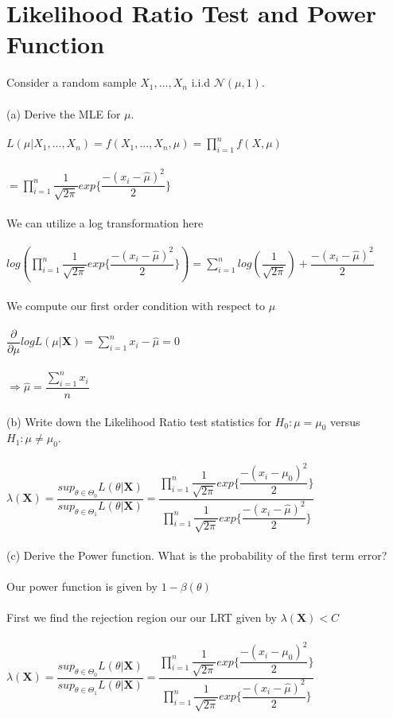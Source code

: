 \documentclass{article}
\begin{document}
\section{Likelihood Ratio Test and Power Function}
Consider a random sample $X_1,...,X_n$ i.i.d $\mathcal{N}(\mu,1)$.\\\\
(a) Derive the MLE for $\mu$.\\\\
$L(\mu|X_1,...,X_n)=f(X_1,...,X_n,\mu)=\prod_{i=1}^nf(X,\mu)$\\\\
$=\prod_{i=1}^n\dfrac{1}{\sqrt{2\pi}}exp\{\dfrac{-(x_i-\hat{\mu})^2}{2}\}$\\\\
We can utilize a log transformation here\\\\
$log(\prod_{i=1}^n\dfrac{1}{\sqrt{2\pi}}exp\{\dfrac{-(x_i-\hat{\mu})^2}{2}\})=\sum_{i=1}^nlog(\dfrac{1}{\sqrt{2\pi}})+\dfrac{-(x_i-\hat{\mu})^2}{2}$\\\\
We compute our first order condition with respect to $\mu$\\\\
$\dfrac{\partial}{\partial\mu}logL(\mu|\textbf{X})=\sum_{i=1}^nx_i-\hat{\mu}=0$\\\\
$\Rightarrow\hat{\mu}=\dfrac{\sum_{i=1}^nx_i}{n}$\\\\
(b) Write down the Likelihood Ratio test statistics for $H_0:\mu=\mu_0$ versus $H_1: \mu\neq\mu_0$.\\\\
$\lambda(\textbf{X})=\dfrac{sup_{\theta\in\Theta_0}L(\theta|\textbf{X})}{sup_{\theta\in\Theta_1}L(\theta|\textbf{X})}=\dfrac{\prod_{i=1}^n\dfrac{1}{\sqrt{2\pi}}exp\{\dfrac{-(x_i-\mu_0)^2}{2}\}}{\prod_{i=1}^n\dfrac{1}{\sqrt{2\pi}}exp\{\dfrac{-(x_i-\hat{\mu})^2}{2}\}}$\\\\
(c) Derive the Power function.  What is the probability of the first term error?\\\\
Our power function is given by $1-\beta(\theta)$\\\\
First we find the rejection region our our LRT given by $\lambda(\textbf{X})<C$\\\\
$\lambda(\textbf{X})=\dfrac{sup_{\theta\in\Theta_0}L(\theta|\textbf{X})}{sup_{\theta\in\Theta_1}L(\theta|\textbf{X})}=\dfrac{\prod_{i=1}^n\dfrac{1}{\sqrt{2\pi}}exp\{\dfrac{-(x_i-\mu_0)^2}{2}\}}{\prod_{i=1}^n\dfrac{1}{\sqrt{2\pi}}exp\{\dfrac{-(x_i-\hat{\mu})^2}{2}\}}$\\\\
\end{document}
